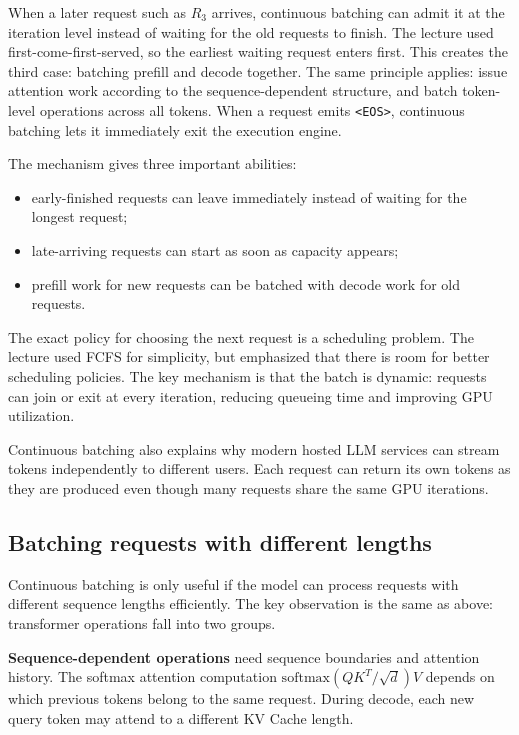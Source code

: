 \documentclass[twoside]{article}
\newcommand{\EOS}{\texttt{<EOS>}}
\begin{document}
When a later request such as \(R_3\) arrives, continuous batching can admit it at the iteration level instead of waiting for the old requests to finish.  The lecture used first-come-first-served, so the earliest waiting request enters first.  This creates the third case: batching prefill and decode together.  The same principle applies: issue attention work according to the sequence-dependent structure, and batch token-level operations across all tokens.  When a request emits \EOS, continuous batching lets it immediately exit the execution engine.

The mechanism gives three important abilities:
\begin{itemize}
  \item early-finished requests can leave immediately instead of waiting for the longest request;
  \item late-arriving requests can start as soon as capacity appears;
  \item prefill work for new requests can be batched with decode work for old requests.
\end{itemize}

The exact policy for choosing the next request is a scheduling problem.  The lecture used FCFS for simplicity, but emphasized that there is room for better scheduling policies.  The key mechanism is that the batch is dynamic: requests can join or exit at every iteration, reducing queueing time and improving GPU utilization.

Continuous batching also explains why modern hosted LLM services can stream tokens independently to different users.  Each request can return its own tokens as they are produced even though many requests share the same GPU iterations.

\subsection{Batching requests with different lengths}

Continuous batching is only useful if the model can process requests with different sequence lengths efficiently.  The key observation is the same as above: transformer operations fall into two groups.

\textbf{Sequence-dependent operations} need sequence boundaries and attention history.  The softmax attention computation \( \mathrm{softmax}(QK^T/\sqrt{d})V \) depends on which previous tokens belong to the same request.  During decode, each new query token may attend to a different KV Cache length.
\end{document}

